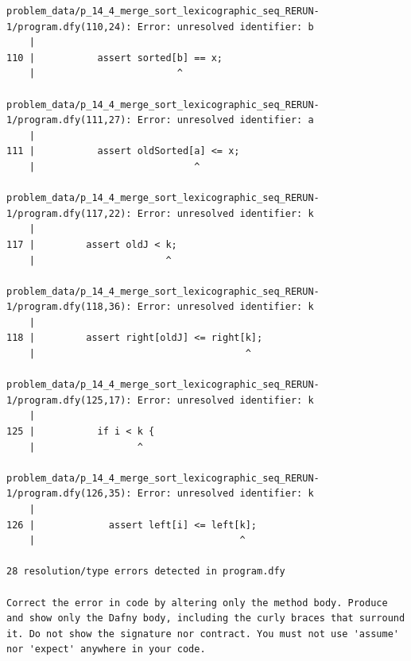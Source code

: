 \documentclass{article}
\begin{document}
\begin{lstlisting}
problem_data/p_14_4_merge_sort_lexicographic_seq_RERUN-1/program.dfy(110,24): Error: unresolved identifier: b
    |
110 |           assert sorted[b] == x;
    |                         ^

problem_data/p_14_4_merge_sort_lexicographic_seq_RERUN-1/program.dfy(111,27): Error: unresolved identifier: a
    |
111 |           assert oldSorted[a] <= x;
    |                            ^

problem_data/p_14_4_merge_sort_lexicographic_seq_RERUN-1/program.dfy(117,22): Error: unresolved identifier: k
    |
117 |         assert oldJ < k;
    |                       ^

problem_data/p_14_4_merge_sort_lexicographic_seq_RERUN-1/program.dfy(118,36): Error: unresolved identifier: k
    |
118 |         assert right[oldJ] <= right[k];
    |                                     ^

problem_data/p_14_4_merge_sort_lexicographic_seq_RERUN-1/program.dfy(125,17): Error: unresolved identifier: k
    |
125 |           if i < k {
    |                  ^

problem_data/p_14_4_merge_sort_lexicographic_seq_RERUN-1/program.dfy(126,35): Error: unresolved identifier: k
    |
126 |             assert left[i] <= left[k];
    |                                    ^

28 resolution/type errors detected in program.dfy

Correct the error in code by altering only the method body. Produce and show only the Dafny body, including the curly braces that surround it. Do not show the signature nor contract. You must not use 'assume' nor 'expect' anywhere in your code.
\end{lstlisting}
\end{document}
